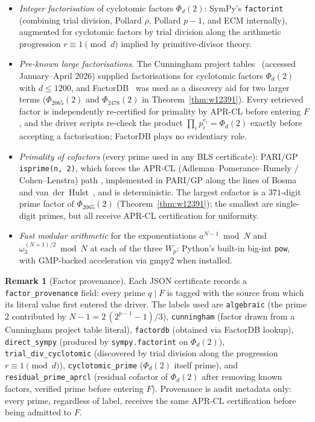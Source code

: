 \documentclass[11pt,a4paper]{amsart}
\theoremstyle{plain}
\theoremstyle{definition}
\newtheorem{remark}[theorem]{Remark}
\newcommand{\wom}{\omega_3}
\begin{document}
\begin{itemize}
\item \emph{Integer factorisation} of cyclotomic factors $\Phi_d(2)$:
  SymPy's \texttt{factorint} (combining trial division, Pollard $\rho$,
  Pollard $p - 1$, and ECM internally), augmented for cyclotomic
  factors by trial division along the arithmetic progression $r \equiv
  1 \pmod{d}$ implied by primitive-divisor theory.

\item \emph{Pre-known large factorisations.} The Cunningham project
  tables~\cite{Cunningham} (accessed January--April 2026) supplied
  factorisations for cyclotomic factors $\Phi_d(2)$ with $d \leq
  1200$, and FactorDB~\cite{FactorDB} was used as a discovery aid for
  two larger terms ($\Phi_{2065}(2)$ and $\Phi_{2478}(2)$ in
  Theorem~\ref{thm:w12391}). Every retrieved factor is independently
  re-certified for primality by APR-CL before entering $F$, and the
  driver scripts re-check the product
  $\prod_i p_i^{e_i} = \Phi_d(2)$ exactly before accepting a
  factorisation; FactorDB plays no evidentiary role.

\item \emph{Primality of cofactors} (every prime used in any BLS
  certificate): PARI/GP \texttt{isprime(n, 2)}, which forces the
  APR-CL (Adleman--Pomerance--Rumely / Cohen--Lenstra) path
  \cite{APR,CohenLenstraAlgo}, implemented in PARI/GP along the lines
  of Bosma and van~der~Hulst~\cite{BosmaVanDerHulst}, and is
  deterministic. The largest
  cofactor is a $371$-digit prime factor of $\Phi_{2065}(2)$
  (Theorem~\ref{thm:w12391}); the smallest are single-digit primes,
  but all receive APR-CL certification for uniformity.

\item \emph{Fast modular arithmetic} for the exponentiations
  $a^{N-1} \bmod N$ and $\wom^{(N+1)/2} \bmod N$ at each of the three
  $W_p$: Python's built-in big-int \texttt{pow}, with GMP-backed
  acceleration via gmpy2 when installed.
\end{itemize}

\begin{remark}[Factor provenance]
\label{rem:provenance}
Each JSON certificate records a \texttt{factor\_provenance} field:
every prime $q \mid F$ is tagged with the source from which its
literal value first entered the driver. The labels used are
\texttt{algebraic} (the prime $2$ contributed by
$N - 1 = 2\,(2^{p-1} - 1)/3$), \texttt{cunningham} (factor drawn from
a Cunningham project table literal), \texttt{factordb} (obtained via
FactorDB lookup), \texttt{direct\_sympy} (produced by
\texttt{sympy.factorint} on $\Phi_d(2)$),
\texttt{trial\_div\_\allowbreak{}cyclotomic}
(discovered by trial division along the progression $r \equiv 1
\pmod{d}$), \texttt{cyclotomic\_prime} ($\Phi_d(2)$ itself prime), and
\texttt{residual\_prime\_\allowbreak{}aprcl}
(residual cofactor of $\Phi_d(2)$ after
removing known factors, verified prime before entering $F$).
Provenance is audit metadata only: every prime, regardless of label,
receives the same APR-CL certification before being admitted to $F$.
\end{remark}
\end{document}
